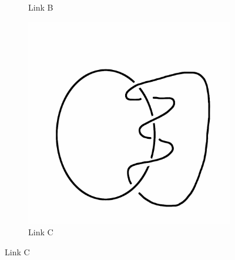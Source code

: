 \documentclass[12pt,letterpaper]{article}
\theoremstyle{definition}
\begin{document}
\begin{figure}[h!]
\begin{subfigure}{.3\textwidth}
        \caption{Link B}
    \end{subfigure}
    \hspace{.5cm}
    \begin{subfigure}{.3\textwidth}
        \centering
        \includegraphics[width=\textwidth]{knotpics/lno3.png}
        \caption{Link C}
    \end{subfigure}
    

\end{figure}
\end{document}
